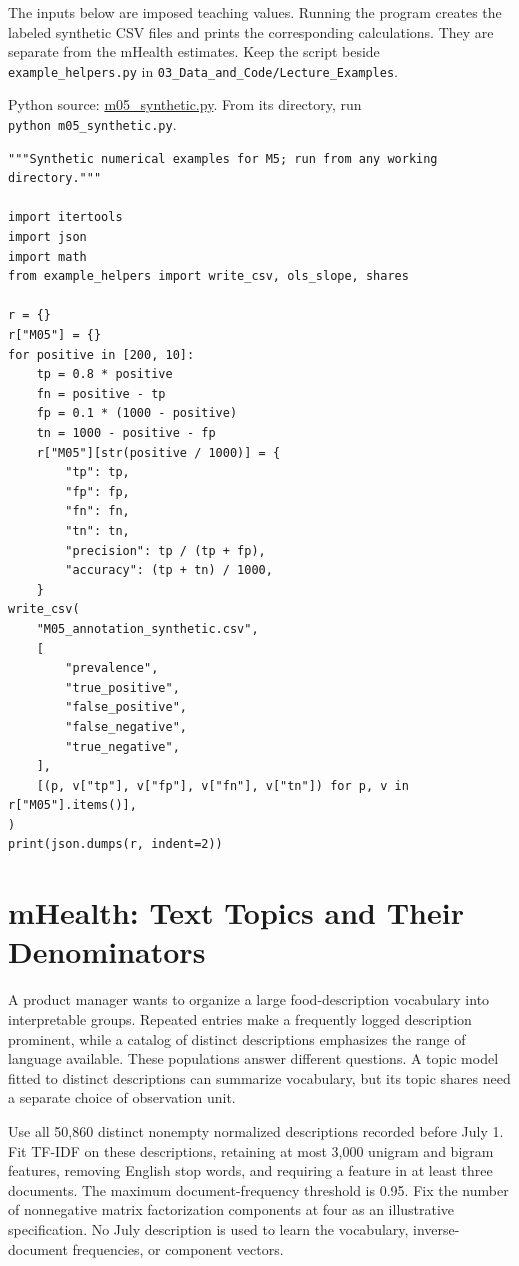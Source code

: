 \noindent The inputs below are imposed teaching values. Running the program
creates the labeled synthetic CSV files and prints the corresponding
calculations. They are separate from the mHealth estimates. Keep the
script beside \texttt{example\_helpers.py} in
\texttt{03\_Data\_and\_Code/Lecture\_Examples}.

\FloatBarrier
{}
Python source:
\href{../03_Data_and_Code/Lecture_Examples/m05_synthetic.py}{m05\_synthetic.py}.
From its directory, run \texttt{python\ m05\_synthetic.py}.

\begin{Verbatim}[breaklines,breakanywhere,fontsize=\small]
"""Synthetic numerical examples for M5; run from any working directory."""

import itertools
import json
import math
from example_helpers import write_csv, ols_slope, shares

r = {}
r["M05"] = {}
for positive in [200, 10]:
    tp = 0.8 * positive
    fn = positive - tp
    fp = 0.1 * (1000 - positive)
    tn = 1000 - positive - fp
    r["M05"][str(positive / 1000)] = {
        "tp": tp,
        "fp": fp,
        "fn": fn,
        "tn": tn,
        "precision": tp / (tp + fp),
        "accuracy": (tp + tn) / 1000,
    }
write_csv(
    "M05_annotation_synthetic.csv",
    [
        "prevalence",
        "true_positive",
        "false_positive",
        "false_negative",
        "true_negative",
    ],
    [(p, v["tp"], v["fp"], v["fn"], v["tn"]) for p, v in r["M05"].items()],
)
print(json.dumps(r, indent=2))
\end{Verbatim}

\hypertarget{M05-mhealth-text-topics-and-their-denominators}{%
\section{mHealth: Text Topics and Their
Denominators}\label{M05-mhealth-text-topics-and-their-denominators}}

\noindent A product manager wants to organize a large food-description vocabulary
into interpretable groups. Repeated entries make a frequently logged
description prominent, while a catalog of distinct descriptions
emphasizes the range of language available. These populations answer
different questions. A topic model fitted to distinct descriptions can
summarize vocabulary, but its topic shares need a separate choice of
observation unit.

Use all 50,860 distinct nonempty normalized descriptions recorded before
July 1. Fit TF-IDF on these descriptions, retaining at most 3,000
unigram and bigram features, removing English stop words, and requiring
a feature in at least three documents. The maximum document-frequency
threshold is 0.95. Fix the number of nonnegative matrix factorization
components at four as an illustrative specification. No July description
is used to learn the vocabulary, inverse-document frequencies, or
component vectors.

